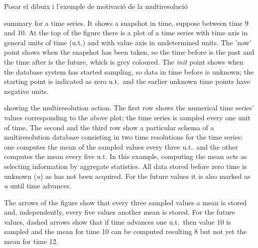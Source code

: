 \todo{}
Posar el dibuix i l'exemple de motivació de la multiresolució


summary for a time series. It shows a snapshot in time, suppose
between time 9 and 10. At the top of the figure there is a plot of a
time series with time axis in general units of time (u.t.) and with
value axis in undetermined units. The 'now' point shows when the
snapshot has been taken, so the time before is the past and the time
after is the future, which is grey coloured. The \emph{init} point
shows when the database system has started sampling, so data in time
before is unknown; the starting point is indicated as zero u.t.\ and
the earlier unknown time points have negative units.





showing the multiresolution action. The first row shows the numerical
time series' values corresponding to the above plot; the time series
is sampled every one unit of time. The second and the third row show a
particular schema of a multiresolution database consisting in two time
resolutions for the time series: one computes the mean of the sampled
values every three u.t.\ and the other computes the mean every five
u.t. In this example, computing the mean acts as selecting information
by aggregate statistics. All data stored before zero time is unknown
(\emph{u}) as has not been acquired. For the future values it is also
marked as \emph{u} until time advances.

The arrows of the figure show that every three sampled values a mean
is stored and, independently, every five values another mean is
stored. For the future values, dashed arrows show that if time
advances one u.t.\ then value 10 is sampled and the mean for time 10
can be computed resulting 8 but not yet the mean for time 12.














